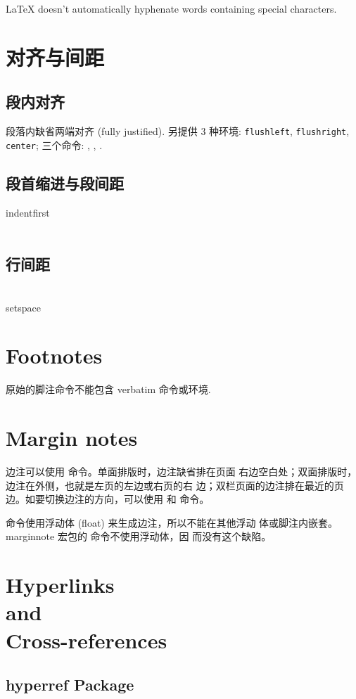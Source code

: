 \documentclass[a4paper,oneside]{book}
\newcommand{\package}[1]{\textsf{#1}}
\newcommand{\command}[1]{\PVerb{#1}}
\begin{document}
\LaTeX{} doesn't automatically hyphenate words containing special characters.

\chapter{对齐与间距}
\section{段内对齐}
段落内缺省两端对齐 (fully justified). 
另提供 3 种环境: \verb|flushleft|, \verb|flushright|, \verb|center|; 三个命令: \command{\raggedright}, \command{\raggedleft}, \command{\centering}.
\section{段首缩进与段间距}
\package{indentfirst}\\
\command{\parindent}\\
\command{\parskip}
\section{行间距}
\command{\linespread}\\
\package{setspace}
\chapter{Footnotes}
原始的脚注命令不能包含 verbatim 命令或环境.

\chapter{Margin notes}
边注可以使用 \command{\marginpar} 命令。单面排版时，边注缺省排在页面
右边空白处；双面排版时，边注在外侧，也就是左页的左边或右页的右
边；双栏页面的边注排在最近的页边。如要切换边注的方向，可以使用
\command{\reversemarginpar} 和 \command{\normalmarginpar} 命令。

\command{\marginpar} 命令使用浮动体 (float)
来生成边注，所以不能在其他浮动
体或脚注内嵌套。marginnote 宏包的 \command{\marginnote} 命令不使用浮动体，因
而没有这个缺陷。

\chapter[Hyperlinks and Cross-references]{Hyperlinks\\ and\\ Cross-references}
\section{\package{hyperref} Package}
\end{document}
